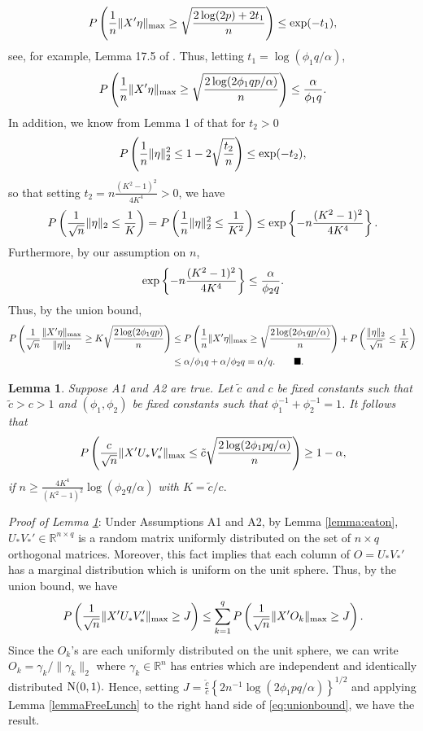 \documentclass[12pt]{article}
\newtheorem{lemma}{Lemma}
\begin{document}
$$ P\left(\frac{1}{n}\|X'\eta\|_{\rm max} \geq \sqrt{\frac{2 \log(2p) + 2t_1}{n}} \right) \leq {\rm exp}(-t_1),$$
see, for example, Lemma 17.5 of \cite{van2016estimation}.
Thus, letting $t_1 = \log(\phi_1 q/\alpha)$, 
$$ P\left(\frac{1}{n}\|X'\eta\|_{\rm max} \geq  \sqrt{\frac{2\log(2 \phi_1 qp/\alpha)}{n}}\right) \leq \frac{\alpha}{\phi_1q}.$$
In addition, we know from Lemma 1 of \citet{laurent2000adaptive} that for $t_2 > 0$
$$ P\left(\frac{1}{n}\|\eta\|_2^2 \leq 1 - 2\sqrt{\frac{t_2}{n}}\right) \leq {\rm exp}(-t_2),$$
so that setting $t_2 = n\frac{(K^2 - 1)^2}{4K^4} > 0$, we have
$$ P\left( \frac{1}{\sqrt{n}} \|\eta\|_2 \leq \frac{1}{K} \right) = P\left(\frac{1}{n}\|\eta\|_2^2 \leq \frac{1}{K^2} \right)  \leq {\rm exp}\left\{ - n\frac{(K^2 - 1)^2}{4K^4} \right\}.$$
Furthermore, by our assumption on $n$, 
$$ {\rm exp}\left\{ - n\frac{(K^2 - 1)^2}{4K^4} \right\} \leq \frac{\alpha}{\phi_2 q}.$$
Thus, by the union bound, 
\begin{align*} 
P\left(\frac{1}{\sqrt{n}}\frac{\|X'\eta\|_{\rm max}}{\|\eta\|_2} \geq K \sqrt{\frac{2 \log(2 \phi_1qp )}{n}} \right) & \leq P\left(\frac{1}{n}\|X'\eta\|_{\rm max} \geq \sqrt{\frac{2\log(2 \phi_1 qp/\alpha)}{n}}\right) + P\left( \frac{\|\eta\|_2}{\sqrt{n}} \leq \frac{1}{K} \right)  \\
& \leq \alpha/\phi_1 q + \alpha/\phi_2 q = \alpha/q. \quad \quad \blacksquare.
\end{align*}


\begin{lemma}\label{lemmaConc}
Suppose A1 and A2 are true. Let $\tilde{c}$ and $c$ be fixed constants such that $\tilde{c} > c > 1$ and $(\phi_1,\phi_2)$ be fixed constants such that $\phi_1^{-1} + \phi_2^{-1} = 1$. It follows that
$$P\left(\frac{c}{\sqrt{n}}\|X'U_*V_*'\|_{\rm max} \leq  \tilde{c} \sqrt{\frac{2\log(2 \phi_1 pq/\alpha)}{n}}\right) \geq 1 - \alpha,$$
if $n \geq \frac{4 K^4}{(K^2 - 1)^2} \log(\phi_2 q/\alpha)$ with $K = \tilde{c}/c.$
\end{lemma}
\noindent \textit{Proof of Lemma \ref{lemmaConc}}: 
Under Assumptions A1 and A2, by Lemma \ref{lemma:eaton}, $U_*V_*' \in \mathbb{R}^{n \times q}$ is a random matrix uniformly distributed on the set of $n \times q$ orthogonal matrices. Moreover, this fact implies that each column of $O = U_*V_*'$ has a marginal distribution which is uniform on the unit sphere. Thus, by the union bound, we have 
\begin{equation}\label{eq:unionbound} P\left(\frac{1}{\sqrt{n}}\|X'U_*V_*'\|_{\rm max} \geq J\right) \leq  \sum_{k=1}^q P\left(\frac{1}{\sqrt{n}}\|X'O_k\|_{\rm max} \geq J\right).
\end{equation}
Since the $O_k$'s are each uniformly distributed on the unit sphere, we can write $O_k = \gamma_k/\|\gamma_k\|_2$ where $\gamma_k \in \mathbb{R}^{n}$ has entries which are independent and identically distributed ${\rm N(0,1)}.$ Hence, setting $J = \frac{\tilde{c}}{c} \left\{ 2 n^{-1} \log(2\phi_1 pq/\alpha)\right\}^{1/2}$ and applying Lemma \ref{lemmaFreeLunch} to the right hand side of \eqref{eq:unionbound}, we have the result. 
\end{document}
